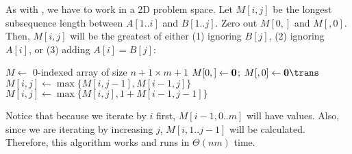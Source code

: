 As with , we have to work in a 2D problem space.
Let $M[i,j]$ be the longest subsequence length between $A[1..i]$ and $B[1..j]$.
Zero out $M[0,]$ and $M[,0]$.
Then, $M[i,j]$ will be the greatest of either 
(1) ignoring $B[j]$, (2) ignoring $A[i]$, or (3) adding $A[i] = B[j]$:

\begin{algorithm}
  \caption{}
  \begin{algorithmic}[1]
    \State $M \gets$ 0-indexed array of size $n+1 \times m+1$
    \State $M[0,] \gets \vb{0}$; $M[,0] \gets \vb{0}\trans$
    \State $M[i,j] \gets \max\{M[i,j-1], M[i-1,j]\}$
     \State $M[i,j] \gets \max\{M[i,j], 1 + M[i-1,j-1]\}$ \EndIf
    \EndFor\EndFor
    \State {}
  \end{algorithmic}
\end{algorithm}

Notice that because we iterate by $i$ first, $M[i-1,0..m]$ will have values.
Also, since we are iterating by increasing $j$, $M[i,1..j-1]$ will be calculated.
Therefore, this algorithm works and runs in $\Theta(nm)$ time.